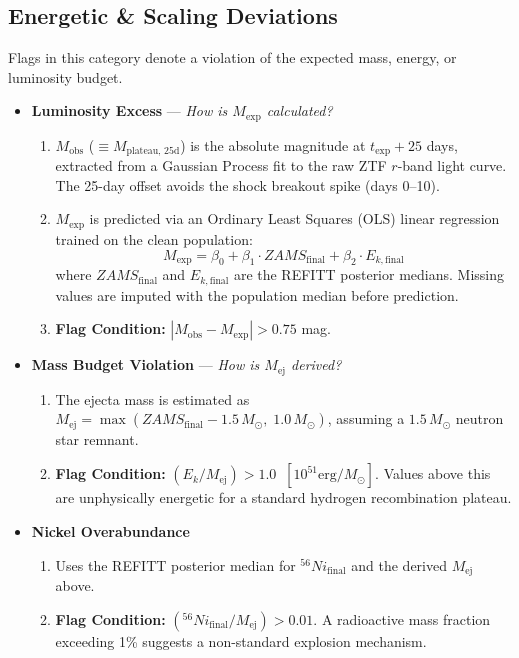 \documentclass[11pt,a4paper]{article}
\begin{document}
\subsection*{Energetic \& Scaling Deviations}
Flags in this category denote a violation of the expected mass, energy, or luminosity budget.
\begin{itemize}
    \item \textbf{Luminosity Excess} --- \textit{How is $M_{\exp}$ calculated?}
    \begin{enumerate}
        \item $M_{\text{obs}}$ ($\equiv M_{\text{plateau, 25d}}$) is the absolute magnitude at $t_{\exp} + 25$ days, extracted from a Gaussian Process fit to the raw ZTF $r$-band light curve. The 25-day offset avoids the shock breakout spike (days 0--10).
        \item $M_{\exp}$ is predicted via an Ordinary Least Squares (OLS) linear regression trained on the clean population:
        $$M_{\exp} = \beta_0 + \beta_1 \cdot ZAMS_{\text{final}} + \beta_2 \cdot E_{k,\text{final}}$$
        where $ZAMS_{\text{final}}$ and $E_{k,\text{final}}$ are the REFITT posterior medians. Missing values are imputed with the population median before prediction.
        \item \textbf{Flag Condition:} $|M_{\text{obs}} - M_{\exp}| > 0.75$ mag.
    \end{enumerate}

    \item \textbf{Mass Budget Violation} --- \textit{How is $M_{\text{ej}}$ derived?}
    \begin{enumerate}
        \item The ejecta mass is estimated as $M_{\text{ej}} = \max(ZAMS_{\text{final}} - 1.5\,M_\odot, \; 1.0\,M_\odot)$, assuming a $1.5\,M_\odot$ neutron star remnant.
        \item \textbf{Flag Condition:} $(E_k / M_{\text{ej}}) > 1.0 \;\; [10^{51}\text{erg} / M_\odot]$. Values above this are unphysically energetic for a standard hydrogen recombination plateau.
    \end{enumerate}

    \item \textbf{Nickel Overabundance}
    \begin{enumerate}
        \item Uses the REFITT posterior median for $^{56}Ni_{\text{final}}$ and the derived $M_{\text{ej}}$ above.
        \item \textbf{Flag Condition:} $(^{56}Ni_{\text{final}} / M_{\text{ej}}) > 0.01$. A radioactive mass fraction exceeding 1\% suggests a non-standard explosion mechanism.
    \end{enumerate}
\end{itemize}
\end{document}

